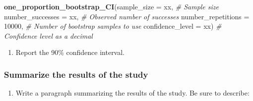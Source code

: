 \documentclass[
]{report}
\newenvironment{Shaded}{\begin{snugshade}}{\end{snugshade}}
\newcommand{\AttributeTok}[1]{\textcolor[rgb]{0.13,0.29,0.53}{#1}}
\newcommand{\CommentTok}[1]{\textcolor[rgb]{0.56,0.35,0.01}{\textit{#1}}}
\newcommand{\DecValTok}[1]{\textcolor[rgb]{0.00,0.00,0.81}{#1}}
\newcommand{\FunctionTok}[1]{\textcolor[rgb]{0.13,0.29,0.53}{\textbf{#1}}}
\newcommand{\NormalTok}[1]{#1}
\providecommand{\tightlist}{%
  \setlength{\itemsep}{0pt}\setlength{\parskip}{0pt}}
\begin{document}
\begin{Shaded}
\begin{Highlighting}[]
\FunctionTok{one\_proportion\_bootstrap\_CI}\NormalTok{(}\AttributeTok{sample\_size =}\NormalTok{ xx, }\CommentTok{\# Sample size}
                    \AttributeTok{number\_successes =}\NormalTok{ xx, }\CommentTok{\# Observed number of successes}
                    \AttributeTok{number\_repetitions =} \DecValTok{10000}\NormalTok{, }\CommentTok{\# Number of bootstrap samples to use}
                    \AttributeTok{confidence\_level =}\NormalTok{ xx) }\CommentTok{\# Confidence level as a decimal}
\end{Highlighting}
\end{Shaded}

\begin{enumerate}
\def\labelenumi{\arabic{enumi}.}
\setcounter{enumi}{6}
\tightlist
\item
  Report the 90\% confidence interval.
\end{enumerate}

\vspace{0.2in}

\subsubsection*{Summarize the results of the study}\label{summarize-the-results-of-the-study}

\begin{enumerate}
\def\labelenumi{\arabic{enumi}.}
\setcounter{enumi}{7}
\tightlist
\item
  Write a paragraph summarizing the results of the study. Be sure to describe:
\end{enumerate}
\end{document}
